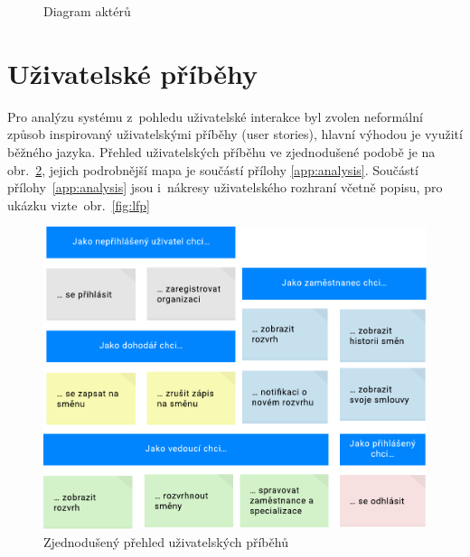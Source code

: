 \documentclass[a4paper,11pt,openany,twoside]{book}
\begin{document}
\begin{figure}[h]
	\centering
	
	\caption{Diagram aktérů}
	\label{fig:userroles}
\end{figure}

\newpage
\section{Uživatelské příběhy}\label{uc-analysis}

Pro analýzu systému z~pohledu uživatelské interakce byl zvolen neformální způsob inspirovaný uživatelskými příběhy (user stories), hlavní výhodou je využití běžného jazyka. Přehled uživatelských příběhu ve zjednodušené podobě je na obr.~\ref{fig:user-stories}, jejich podrobnější mapa je součástí přílohy \ref{app:analysis}. Součástí přílohy~\ref{app:analysis} jsou i~nákresy uživatelského rozhraní včetně popisu, pro ukázku vizte~obr.~\ref{fig:lfp}


\begin{figure}[h!]
	\centering
	\includegraphics[scale=0.7]{user-stories.pdf}
	\caption{Zjednodušený přehled uživatelských příběhů}
	\label{fig:user-stories}
\end{figure}
\end{document}
